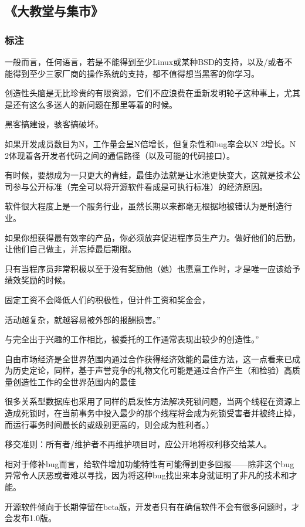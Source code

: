 \subsection{《大教堂与集市》}
\subsubsection{标注}

一般而言，任何语言，若是不能得到至少Linux或某种BSD的支持，以及/或者不能得到至少三家厂商的操作系统的支持，都不值得想当黑客的你学习。

创造性头脑是无比珍贵的有限资源，它们不应浪费在重新发明轮子这种事上，尤其是还有这么多迷人的新问题在那里等着的时候。

黑客搞建设，骇客搞破坏。

如果开发成员数目为N，工作量会呈N倍增长，但复杂性和bug率会以N 2增长。N 2体现着各开发者代码之间的通信路径（以及可能的代码接口）。

有时候，要想成为一只更大的青蛙，最佳办法就是让水池更快变大，这就是技术公司参与公开标准（完全可以将开源软件看成是可执行标准）的经济原因。

软件很大程度上是一个服务行业，虽然长期以来都毫无根据地被错认为是制造行业。

如果你想获得最有效率的产品，你必须放弃促进程序员生产力。做好他们的后勤，让他们自己做主，并忘掉最后期限。

只有当程序员非常积极以至于没有奖励他（她）也愿意工作时，才是唯一应该给予绩效奖励的时候。

固定工资不会降低人们的积极性，但计件工资和奖金会，

活动越复杂，就越容易被外部的报酬损害。”

与完全出于兴趣的工作相比，被委托的工作通常表现出较少的创造性。”

自由市场经济是全世界范围内通过合作获得经济效能的最佳方法，这一点看来已成为历史定论，同样，基于声誉竞争的礼物文化可能是通过合作产生（和检验）高质量创造性工作的全世界范围内的最佳

很多关系型数据库也采用了同样的启发性方法解决死锁问题，当两个线程在资源上造成死锁时，在当前事务中投入最少的那个线程将会成为死锁受害者并被终止掉，而运行事务时间最长的或级别更高的，则会成为胜利者。）

移交准则：所有者/维护者不再维护项目时，应公开地将权利移交给某人。

相对于修补bug而言，给软件增加功能特性有可能得到更多回报——除非这个bug异常令人厌恶或者难以寻找，因为将这种bug找出来本身就证明了非凡的技术和才能。

开源软件倾向于长期停留在beta版，开发者只有在确信软件不会有很多问题时，才会发布1.0版。

